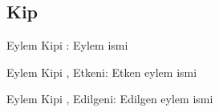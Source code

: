 \subsection*{Kip }

\begin{eylemkipi}{Eylem Kipi : }
  Eylem ismi
\end{eylemkipi}

\begin{eylemkipi}{Eylem Kipi , Etkeni: }
  Etken eylem ismi
\end{eylemkipi}

\begin{eylemkipi}{Eylem Kipi , Edilgeni: }
  Edilgen eylem ismi
\end{eylemkipi}





